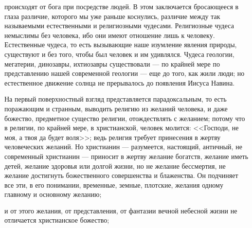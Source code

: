 \documentclass[12pt]{article}
\begin{document}
происходят от бога при посредстве людей. В этом заключается бросающееся в глаза различие, которого мы уже раньше коснулись, различие между так называемыми естественными и религиозными чудесами. Религиозные чудеса немыслимы без человека, ибо они имеют отношение лишь к человеку. Естественные чудеса, то есть вызывающие наше изумление явления природы, существуют и без того, чтобы был человек и им удивлялся. Чудеса геологии, мегатерии, динозавры, ихтиозавры существовали --- по крайней мере по представлению нашей современной геологии --- еще до того, как жили люди; но естественное движение солнца не прерывалось до появления Иисуса Навина. 

На первый поверхностный взгляд представляется парадоксальным, то есть поражающим и странным, выводить религию из желаний человека, и даже божество, предметное существо религии, отождествлять с желанием; потому что в религии, по крайней мере, в христианской, человек молится: <<Господи, не моя, а твоя да будет воля>>; ведь религия требует принесения в жертву человеческих желаний. Но христианин --- разумеется, настоящий, античный, не современный христианин --- приносит в жертву желание богатств, желание иметь детей, желание здоровья или долгой жизни, но не желание бессмертия, не желание достигнуть божественного совершенства и блаженства. Он подчиняет все эти, в его понимании, временные, земные, плотские, желания одному главному и основному желанию; 

и от этого желания, от представления, от фантазии вечной небесной жизни не отличается христианское божество; 
\end{document}

